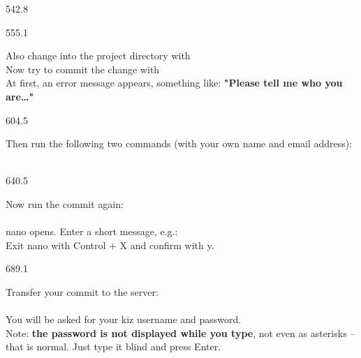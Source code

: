 \documentclass{aslab}
\begin{document}
\begin{region}{542.8}
\end{region}

\begin{region}[pitch=12.65]{555.1}
\begin{alphatasks}
\item Also change into the project directory with \\
  Now try to commit the change with \\
  At first, an error message appears, something like:
  \textbf{"Please tell me who you are…"}
\end{alphatasks}
\end{region}

\begin{region}[pitch=12.1]{604.5}
\begin{alphatasks}[start=2]
\item Then run the following two commands (with your own name and email
  address):\\
  \\
\end{alphatasks}
\end{region}

\begin{region}[pitch=12.2]{640.5}
\begin{alphatasks}[start=3]
\item Now run the commit again:\\
  \\
  nano opens. Enter a short message, e.g.: \\
  Exit nano with Control + X and confirm with y.
\end{alphatasks}
\end{region}

\begin{region}[pitch=12.25]{689.1}
\begin{alphatasks}[start=4]
\item Transfer your commit to the server:\\
  \\
  You will be asked for your kiz username and password.\\
  Note: \textbf{the password is not displayed while you type}, not even as
  asterisks -- that is normal. Just type it blind and press Enter.
\end{alphatasks}
\end{region}
\end{document}
